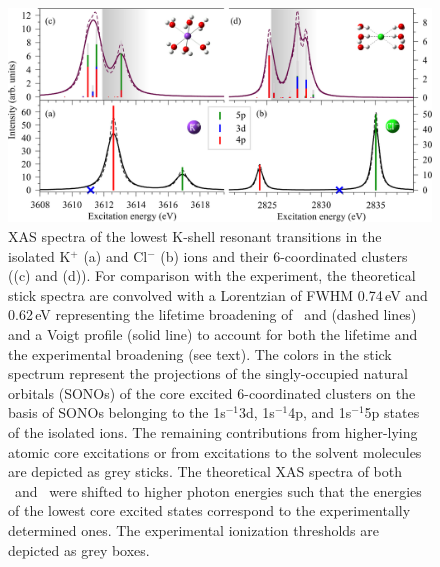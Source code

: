 \begin{figure}[h!]
\centering
\includegraphics[scale=0.55]{figures/xas_spectra.eps}
\caption{XAS spectra of the lowest K-shell resonant transitions in the isolated K$^{+}$ (a) and Cl$^{-}$ (b) ions and their 6-coordinated clusters ((c) and (d)). For comparison with the experiment, the theoretical stick spectra are convolved with a Lorentzian of FWHM 0.74\,eV and 0.62\,eV representing the lifetime broadening of \ki~and \cli \citep{Krause79:329} (dashed lines) and a Voigt profile (solid line) to account for both the lifetime and the experimental broadening (see text). The colors in the stick spectrum represent the projections of the singly-occupied natural orbitals (SONOs) of the core excited 6-coordinated clusters on the basis of SONOs belonging to the 1s$^{-1}$3d, 1s$^{-1}$4p, and 1s$^{-1}$5p states of the isolated ions. The remaining contributions from higher-lying atomic core excitations or from excitations to the solvent molecules are depicted as grey sticks. The theoretical XAS spectra of both \ki~and \cli~were shifted to higher photon energies such that the energies of the lowest core excited states correspond to the experimentally determined ones. The experimental ionization thresholds are depicted as grey boxes.}
\label{fg:xas_kcl}
\end{figure}


